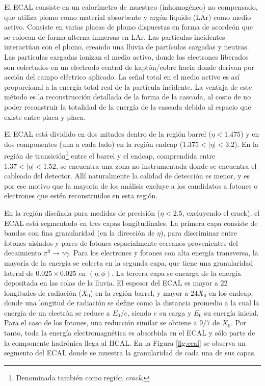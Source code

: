 El ECAL consiste en un calorímetro de muestreo (inhomogéneo) no compensado, que utiliza plomo como material absorbente y argón líquido (LAr) como medio activo. Consiste en varias placas de plomo dispuestas en forma de acordeón que se colocan de forma alterna inmersas en LAr. Las partículas incidentes interactúan con el plomo, creando una lluvia de partículas cargadas y neutras. Las partículas cargadas ionizan el medio activo, donde los electrones liberados son colectados en un electrodo central de kaptón/cobre hacia donde derivan por acción del campo eléctrico aplicado. La señal total en el medio activo es así proporcional a la energía total real de la partícula incidente. La ventaja de este método es la reconstrucción detallada de la forma de la cascada, al costo de no poder reconstruir la totalidad de la energía de la cascada debido al espacio que existe entre placa y placa.


El ECAL está dividido en dos mitades dentro de la región barrel ($\eta < 1.475$) y en dos componentes (una a cada lado) en la región endcap ($1.375 < |\eta| < 3.2$). 
En la región de transición\footnote{Denominada también como región \textit{crack}.} entre el barrel y el endcap, comprendida entre $1.37 < |\eta| < 1.52$, se encuentra una zona no instrumentada donde se encuentra el cableado del detector. 
Allí naturalmente la calidad de detección es menor, y es por ese motivo que la mayoría de los análisis excluye a los candidatos a fotones o electrones que estén reconstruidos en esta región.

En la región diseñada para medidas de precisión ($\eta < 2.5$, excluyendo el crack),
el ECAL está segmentado en tres capas longitudinales. La primera capa consiste de
bandas con fina granularidad (en la dirección de $\eta$), para discriminar entre fotones
aislados y pares de fotones espacialmente cercanos provenientes del decaimiento
$\pi^0\to\gamma\gamma$. Para los electrones y fotones con alta energía transversa, la mayoría
de la energía se colecta en la segunda capa, que tiene una granularidad lateral de
$0.025 \times 0.025$ en $(\eta, \phi)$. La tercera capa se encarga de la energía depositada en las
colas de la lluvia.
El espesor del ECAL es mayor a 22 longitudes de radiación ($X_0$) en la región
barrel, y mayor a $24X_0$ en los endcap, donde una longitud de radiación se define
como la distancia promedio a la cual la energía de un electrón se reduce a $E_0/e$, siendo $e$ su carga y $E_0$ su energía inicial. Para el caso de los fotones, una reducción similar se obtiene a
$9/7$ de $X_0$. Por tanto, toda la energía electromagnética es absorbida en el ECAL y
sólo parte de la componente hadrónica llega al HCAL. En la Figura \ref{fig:ecal} se observa un segmento del ECAL donde se muestra la granularidad de cada una de sus capas.

